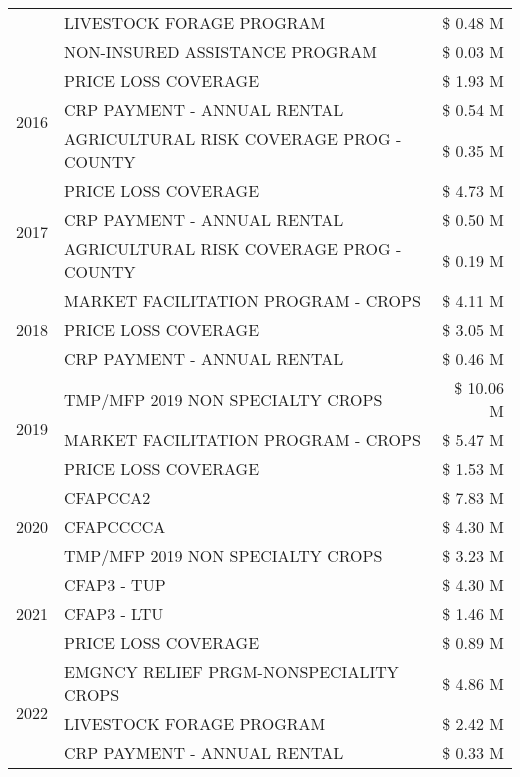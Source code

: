 \begin{tabular}{llr}
 & LIVESTOCK FORAGE PROGRAM & \$ 0.48 M \\
 & NON-INSURED ASSISTANCE PROGRAM & \$ 0.03 M \\
\cline{1-3}
\multirow[t]{3}{*}{2016} & PRICE LOSS COVERAGE & \$ 1.93 M \\
 & CRP PAYMENT - ANNUAL RENTAL & \$ 0.54 M \\
 & AGRICULTURAL RISK COVERAGE PROG - COUNTY & \$ 0.35 M \\
\cline{1-3}
\multirow[t]{3}{*}{2017} & PRICE LOSS COVERAGE & \$ 4.73 M \\
 & CRP PAYMENT - ANNUAL RENTAL & \$ 0.50 M \\
 & AGRICULTURAL RISK COVERAGE PROG - COUNTY & \$ 0.19 M \\
\cline{1-3}
\multirow[t]{3}{*}{2018} & MARKET FACILITATION PROGRAM - CROPS & \$ 4.11 M \\
 & PRICE LOSS COVERAGE & \$ 3.05 M \\
 & CRP PAYMENT - ANNUAL RENTAL & \$ 0.46 M \\
\cline{1-3}
\multirow[t]{3}{*}{2019} & TMP/MFP 2019 NON SPECIALTY CROPS & \$ 10.06 M \\
 & MARKET FACILITATION PROGRAM - CROPS & \$ 5.47 M \\
 & PRICE LOSS COVERAGE & \$ 1.53 M \\
\cline{1-3}
\multirow[t]{3}{*}{2020} & CFAPCCA2 & \$ 7.83 M \\
 & CFAPCCCCA & \$ 4.30 M \\
 & TMP/MFP 2019 NON SPECIALTY CROPS & \$ 3.23 M \\
\cline{1-3}
\multirow[t]{3}{*}{2021} & CFAP3 - TUP & \$ 4.30 M \\
 & CFAP3 - LTU & \$ 1.46 M \\
 & PRICE LOSS COVERAGE & \$ 0.89 M \\
\cline{1-3}
\multirow[t]{3}{*}{2022} & EMGNCY RELIEF PRGM-NONSPECIALITY CROPS & \$ 4.86 M \\
 & LIVESTOCK FORAGE PROGRAM & \$ 2.42 M \\
 & CRP PAYMENT - ANNUAL RENTAL & \$ 0.33 M \\
\cline{1-3}
\bottomrule
\end{tabular}
